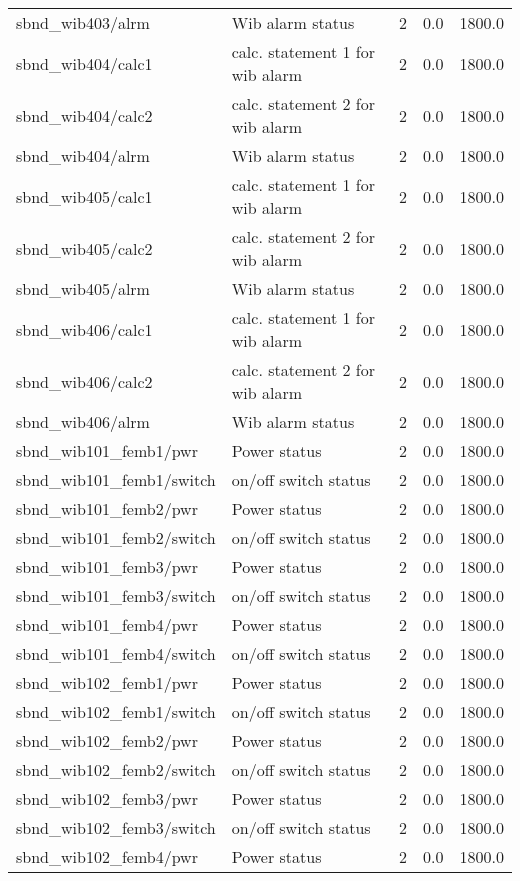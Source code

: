 \begin{center}
\begin{longtable}{l | l l l l }
sbnd\_wib403/alrm & Wib alarm status & 2 & 0.0 & 1800.0\\ 
sbnd\_wib404/calc1 & calc. statement 1 for wib alarm & 2 & 0.0 & 1800.0\\ 
sbnd\_wib404/calc2 & calc. statement 2 for wib alarm & 2 & 0.0 & 1800.0\\ 
sbnd\_wib404/alrm & Wib alarm status & 2 & 0.0 & 1800.0\\ 
sbnd\_wib405/calc1 & calc. statement 1 for wib alarm & 2 & 0.0 & 1800.0\\ 
sbnd\_wib405/calc2 & calc. statement 2 for wib alarm & 2 & 0.0 & 1800.0\\ 
sbnd\_wib405/alrm & Wib alarm status & 2 & 0.0 & 1800.0\\ 
sbnd\_wib406/calc1 & calc. statement 1 for wib alarm & 2 & 0.0 & 1800.0\\ 
sbnd\_wib406/calc2 & calc. statement 2 for wib alarm & 2 & 0.0 & 1800.0\\ 
sbnd\_wib406/alrm & Wib alarm status & 2 & 0.0 & 1800.0\\ 
sbnd\_wib101\_femb1/pwr & Power status & 2 & 0.0 & 1800.0\\ 
sbnd\_wib101\_femb1/switch & on/off switch status & 2 & 0.0 & 1800.0\\ 
sbnd\_wib101\_femb2/pwr & Power status & 2 & 0.0 & 1800.0\\ 
sbnd\_wib101\_femb2/switch & on/off switch status & 2 & 0.0 & 1800.0\\ 
sbnd\_wib101\_femb3/pwr & Power status & 2 & 0.0 & 1800.0\\ 
sbnd\_wib101\_femb3/switch & on/off switch status & 2 & 0.0 & 1800.0\\ 
sbnd\_wib101\_femb4/pwr & Power status & 2 & 0.0 & 1800.0\\ 
sbnd\_wib101\_femb4/switch & on/off switch status & 2 & 0.0 & 1800.0\\ 
sbnd\_wib102\_femb1/pwr & Power status & 2 & 0.0 & 1800.0\\ 
sbnd\_wib102\_femb1/switch & on/off switch status & 2 & 0.0 & 1800.0\\ 
sbnd\_wib102\_femb2/pwr & Power status & 2 & 0.0 & 1800.0\\ 
sbnd\_wib102\_femb2/switch & on/off switch status & 2 & 0.0 & 1800.0\\ 
sbnd\_wib102\_femb3/pwr & Power status & 2 & 0.0 & 1800.0\\ 
sbnd\_wib102\_femb3/switch & on/off switch status & 2 & 0.0 & 1800.0\\ 
sbnd\_wib102\_femb4/pwr & Power status & 2 & 0.0 & 1800.0\\ 

\end{longtable}
\end{center}
